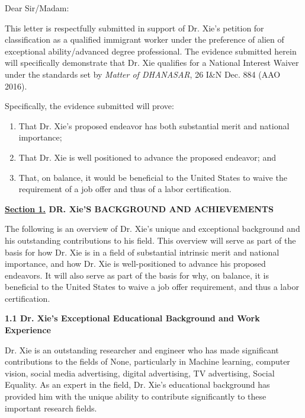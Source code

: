 \documentclass{article}
\begin{document}
Dear Sir/Madam:

This letter is respectfully submitted in support of Dr. Xie's petition for classification as a qualified immigrant worker under the preference of alien of exceptional ability/advanced degree professional. The evidence submitted herein will specifically demonstrate that Dr. Xie qualifies for a National Interest Waiver under the standards set by \textit{Matter of DHANASAR}, 26 I\&N Dec. 884 (AAO 2016).

Specifically, the evidence submitted will prove:
\begin{enumerate}
    \item That Dr. Xie's proposed endeavor has both substantial merit and national importance;
    \item That Dr. Xie is well positioned to advance the proposed endeavor; and
    \item That, on balance, it would be beneficial to the United States to waive the requirement of a job offer and thus of a labor certification.
\end{enumerate}

\clearpage





{\bf \underline{Section 1.} DR. Xie'S BACKGROUND AND ACHIEVEMENTS}

The following is an overview of Dr. Xie's unique and exceptional background and his outstanding contributions to his field. This overview will serve as part of the basis for how Dr. Xie is in a field of substantial intrinsic merit and national importance, and how Dr. Xie is well-positioned to advance his proposed endeavors. It will also serve as part of the basis for why, on balance, it is beneficial to the United States to waive a job offer requirement, and thus a labor certification.

{\bf 1.1 Dr. Xie's Exceptional Educational Background and Work Experience}

Dr. Xie is an outstanding researcher and engineer who has made significant contributions to the fields of None, particularly in Machine learning, computer vision, social media advertising, digital advertising, TV advertising, Social Equality. As an expert in the field, Dr. Xie's educational background has provided him with the unique ability to contribute significantly to these important research fields.
\end{document}
